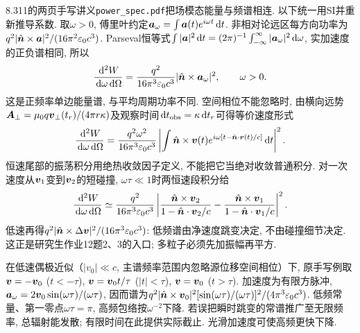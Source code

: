 8.311的两页手写讲义\texttt{power\_spec.pdf}把场模态能量与频谱相连. 以下统一用SI并重新推导系数. 取$\omega>0$, 傅里叶约定$\boldsymbol{a}_\omega=\int\boldsymbol{a}(t)e^{i\omega t}\,\mathrm d t$. 非相对论远区每方向功率为$q^2|\hat{\boldsymbol{n}}\times\boldsymbol{a}|^2/(16\pi^2\varepsilon_0 c^3)$. Parseval恒等式$\int|\boldsymbol{a}|^2\,\mathrm d t=(2\pi)^{-1}\int_{-\infty}^{\infty}|\boldsymbol{a}_\omega|^2\,\mathrm d\omega$, 实加速度的正负谱相同, 所以
\[
\frac{\,\mathrm d^2 W}{\,\mathrm d\omega\,\mathrm d\Omega}=\frac{q^2}{16\pi^3\varepsilon_0 c^3}|\hat{\boldsymbol{n}}\times\boldsymbol{a}_\omega|^2,\qquad \omega>0.
\]
这是正频率单边能量谱, 与平均周期功率不同. 空间相位不能忽略时, 由横向远势$\boldsymbol{A}_\perp=\mu_0q\boldsymbol{v}_\perp(t_r)/(4\pi r\kappa)$及观察时间$\,\mathrm d t_{\rm obs}=\kappa\,\mathrm d t_r$可得等价速度形式
\[
\frac{\,\mathrm d^2W}{\,\mathrm d\omega\,\mathrm d\Omega}=\frac{q^2\omega^2}{16\pi^3\varepsilon_0 c^3}\left|\int\hat{\boldsymbol{n}}\times\boldsymbol{v}(t)e^{i\omega[t-\hat{\boldsymbol{n}}\cdot\boldsymbol{r}(t)/c]}\,\mathrm d t\right|^2.
\]
恒速尾部的振荡积分用绝热收敛因子定义, 不能把它当绝对收敛普通积分. 对一次速度从$\boldsymbol{v}_1$变到$\boldsymbol{v}_2$的短碰撞, $\omega\tau\ll1$时两恒速段积分给
\[
\frac{\,\mathrm d^2W}{\,\mathrm d\omega\,\mathrm d\Omega}\simeq\frac{q^2}{16\pi^3\varepsilon_0 c^3}\left|\frac{\hat{\boldsymbol{n}}\times\boldsymbol{v}_2}{1-\hat{\boldsymbol{n}}\cdot\boldsymbol{v}_2/c}-\frac{\hat{\boldsymbol{n}}\times\boldsymbol{v}_1}{1-\hat{\boldsymbol{n}}\cdot\boldsymbol{v}_1/c}\right|^2.
\]
低速再得$q^2|\hat{\boldsymbol{n}}\times\Delta\boldsymbol{v}|^2/(16\pi^3\varepsilon_0 c^3)$: 低频谱由净速度跳变决定, 不由碰撞细节决定. 这正是研究生作业12题2、3的入口; 多粒子必须先加振幅再平方.

在低速偶极近似（$|v_0|\ll c$, 主谱频率范围内忽略源位移空间相位）下, 原手写例取$\boldsymbol{v}=-\boldsymbol{v}_0$ ($t<-\tau$), $\boldsymbol{v}=\boldsymbol{v}_0t/\tau$ ($|t|<\tau$), $\boldsymbol{v}=\boldsymbol{v}_0$ ($t>\tau$). 加速度为有限方脉冲, $\boldsymbol{a}_\omega=2\boldsymbol{v}_0\sin(\omega\tau)/(\omega\tau)$, 因而谱为$q^2|\hat{\boldsymbol{n}}\times\boldsymbol{v}_0|^2[\sin(\omega\tau)/(\omega\tau)]^2/(4\pi^3\varepsilon_0 c^3)$. 低频常量、第一零点$\omega\tau=\pi$, 高频包络按$\omega^{-2}$下降. 若误把瞬时跳变的常谱推广至无限频率, 总辐射能发散; 有限时间在此提供实际截止. 光滑加速度可使高频更快下降.
\begin{center}\end{center}
